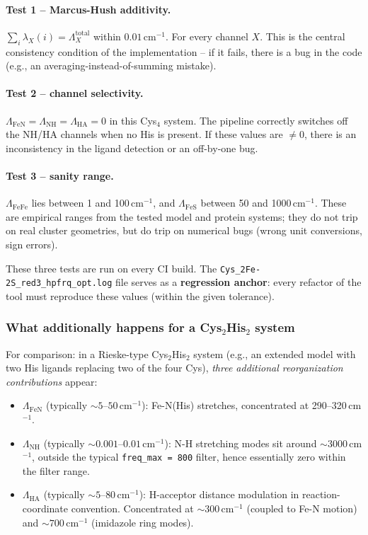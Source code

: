 \documentclass[11pt,a4paper,twoside]{article}
\theoremstyle{remark}
\begin{document}
\paragraph{Test 1 -- Marcus-Hush additivity.}
$\sum_i \lambda_X(i) = \Lambda_X^\text{total}$ within
$0.01$\,cm$^{-1}$. For every channel $X$. This is the central
consistency condition of the implementation -- if it fails, there
is a bug in the code (e.g., an averaging-instead-of-summing
mistake).

\paragraph{Test 2 -- channel selectivity.}
$\Lambda_\text{FeN} = \Lambda_\text{NH} = \Lambda_\text{HA} = 0$
in this Cys$_4$ system. The pipeline correctly switches off the
NH/HA channels when no His is present. If these values are
$\neq 0$, there is an inconsistency in the ligand detection or an
off-by-one bug.

\paragraph{Test 3 -- sanity range.}
$\Lambda_\text{FeFe}$ lies between 1 and 100\,cm$^{-1}$, and
$\Lambda_\text{FeS}$ between 50 and 1000\,cm$^{-1}$. These are
empirical ranges from the tested model and protein systems; they
do not trip on real cluster geometries, but do trip on numerical
bugs (wrong unit conversions, sign errors).

These three tests are run on every CI build. The
\texttt{Cys\_2Fe-2S\_red3\_hpfrq\_opt.log} file serves as a
\textbf{regression anchor}: every refactor of the tool must
reproduce these values (within the given tolerance).

\subsubsection*{What additionally happens for a Cys$_2$His$_2$ system}

For comparison: in a Rieske-type Cys$_2$His$_2$ system (e.g., an
extended model with two His ligands replacing two of the four
Cys), \emph{three additional reorganization contributions}
appear:

\begin{itemize}\setlength{\itemsep}{0pt}
  \item \textbf{$\Lambda_\text{FeN}$} (typically
        $\sim 5$--$50$\,cm$^{-1}$): Fe-N(His) stretches,
        concentrated at 290--320\,cm$^{-1}$.
  \item \textbf{$\Lambda_\text{NH}$} (typically
        $\sim 0.001$--$0.01$\,cm$^{-1}$): N-H stretching modes
        sit around $\sim 3000$\,cm$^{-1}$, outside the typical
        \texttt{freq\_max = 800} filter, hence essentially zero
        within the filter range.
  \item \textbf{$\Lambda_\text{HA}$} (typically
        $\sim 5$--$80$\,cm$^{-1}$): H-acceptor distance
        modulation in reaction-coordinate convention.
        Concentrated at $\sim 300$\,cm$^{-1}$ (coupled to Fe-N
        motion) and $\sim 700$\,cm$^{-1}$ (imidazole ring
        modes).
\end{itemize}
\end{document}
